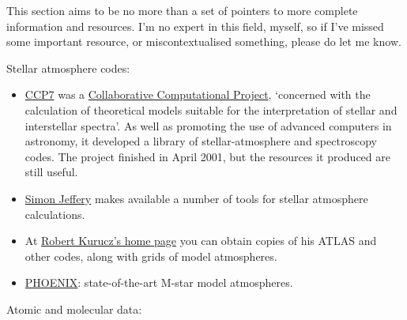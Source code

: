 \documentclass[11pt,oneside,chapters]{starlink}
\begin{document}

This section aims to be no more than a set of pointers to more
complete information and resources.  I'm no expert in this field,
myself, so if I've missed some important resource, or
miscontextualised something, please do let me know.

Stellar atmosphere codes:

\begin{itemize}
\item
\href{http://ccp7.dur.ac.uk/}{CCP7}
was a
\href{http://www.dci.clrc.ac.uk/ListActivities.asp?Class=5;Classtype=21;}{Collaborative Computational Project},
`concerned with the
calculation of theoretical models suitable for the
interpretation of stellar and interstellar spectra'.
As well as promoting the use of advanced computers in
astronomy, it developed a library of
stellar-atmosphere and spectroscopy codes.  The
project finished in April 2001, but the resources it
produced are still useful.

\item
\href{http://star.arm.ac.uk/~csj/}{Simon Jeffery}
makes available a number of tools
for stellar atmosphere calculations.

\item
At \href{http://kurucz.harvard.edu/}{Robert Kurucz's home page}
you can obtain copies of
his ATLAS and other codes, along with grids of model
atmospheres.

\item
\href{http://phoenix.physast.uga.edu/}{PHOENIX}:
state-of-the-art M-star model atmospheres.
\end{itemize}

Atomic and molecular data:
\end{document}
